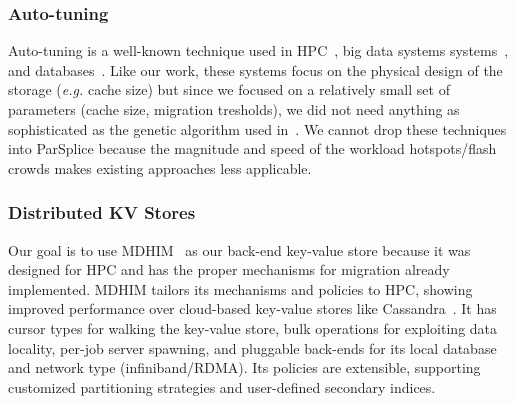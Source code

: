 \subsubsection*{Auto-tuning} Auto-tuning is a well-known technique used in
HPC~\cite{behzad:sc2013-autotuning, behzad:techreport2014-io-autotuning}, big
data systems systems~\cite{herodotou_starfish_2011}, and
databases~\cite{schnaitter_index_2009}.  Like our work, these systems focus on
the physical design of the storage ({\it e.g.} cache size) but since we focused
on a relatively small set of parameters (cache size, migration tresholds), we
did not need anything as sophisticated as the genetic algorithm used
in~\cite{behzad:sc2013-autotuning}.  We cannot drop these techniques into
ParSplice because the magnitude and speed of the workload hotspots/flash crowds
makes existing approaches less applicable. 

\subsubsection*{Distributed KV Stores}

Our goal is to use MDHIM~\cite{greenberg:hotstorage2015-mdhim} as our back-end
key-value store because it was designed for HPC and has the proper mechanisms
for migration already implemented.  MDHIM tailors its mechanisms and policies
to HPC, showing improved performance over cloud-based key-value stores like
Cassandra~\cite{lakshman_cassandra_2010}. It has cursor types for walking the
key-value store, bulk operations for exploiting data locality, per-job server
spawning, and pluggable back-ends for its local database and network type
(infiniband/RDMA). Its policies are extensible, supporting customized partitioning
strategies and user-defined secondary indices.
